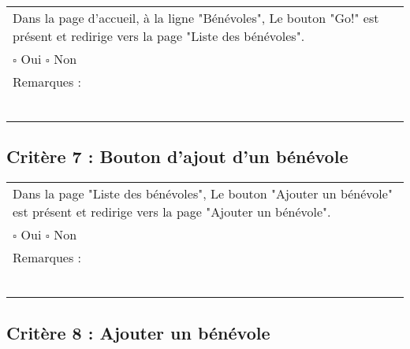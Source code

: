 	\begin{center}
    	 		\begin{tabular}[h]{|p{}|}
			\hline
				Dans la page d'accueil, à la ligne "Bénévoles", Le bouton "Go!" est présent et redirige vers la page "Liste des bénévoles". \\
				$\square$ Oui  \hfill \hfill $\square$ Non \\\hline Remarques : \\ ~\\
			 \\\hline
     		\end{tabular}
  		\end{center}	
  		
  		
  	\subsection*{Critère 7 : Bouton d'ajout d'un bénévole}
	
	\begin{center}
    	 		\begin{tabular}[h]{|p{}|}
			\hline
				Dans la page "Liste des bénévoles", Le bouton "Ajouter un bénévole" est présent et redirige vers la page "Ajouter un bénévole". \\
				$\square$ Oui  \hfill \hfill $\square$ Non \\\hline Remarques : \\ ~\\
			 \\\hline
     		\end{tabular}
  		\end{center}	
  		
  		
  	\subsection*{Critère 8 : Ajouter un bénévole}
	
